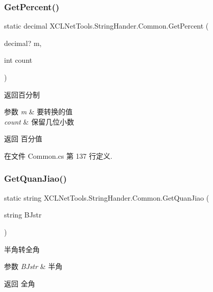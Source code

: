 \subsubsection{\texorpdfstring{Get\+Percent()}{GetPercent()}}
{\footnotesize\ttfamily static decimal X\+C\+L\+Net\+Tools.\+String\+Hander.\+Common.\+Get\+Percent (\begin{DoxyParamCaption}\item[{decimal?}]{m,  }\item[{int}]{count }\end{DoxyParamCaption})\hspace{0.3cm}{\ttfamily [static]}}



返回百分制 


\begin{DoxyParams}{参数}
{\em m} & 要转换的值\\
\hline
{\em count} & 保留几位小数\\
\hline
\end{DoxyParams}
\begin{DoxyReturn}{返回}
百分值
\end{DoxyReturn}


在文件 Common.\+cs 第 137 行定义.

\mbox{\label{class_x_c_l_net_tools_1_1_string_hander_1_1_common_ac4c5c91417fc48267b8c2600bb857dca}} 
\subsubsection{\texorpdfstring{Get\+Quan\+Jiao()}{GetQuanJiao()}}
{\footnotesize\ttfamily static string X\+C\+L\+Net\+Tools.\+String\+Hander.\+Common.\+Get\+Quan\+Jiao (\begin{DoxyParamCaption}\item[{string}]{B\+Jstr }\end{DoxyParamCaption})\hspace{0.3cm}{\ttfamily [static]}}



半角转全角 


\begin{DoxyParams}{参数}
{\em B\+Jstr} & 半角\\
\hline
\end{DoxyParams}
\begin{DoxyReturn}{返回}
全角
\end{DoxyReturn}


